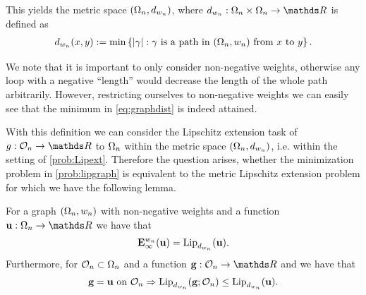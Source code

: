 %
This yields the metric space $(\Omega_n, d_{w_n})$, where $d_{w_n}:\domain_n\times\domain_n\to\R$ is defined as
%
\begin{align}\label{eq:graphdist}
d_{w_n}(x,y) := \min \left\{ \left|\gamma\right|: \gamma \text{ is a path in } 
(\Omega_n, w_n)\text{ from } x \text{ to } y\right\}.
\end{align}
%
\begin{remark}{}{}
We note that it is important to only consider non-negative weights, otherwise any loop with a negative \enquote{length} would decrease the 
length of the whole path arbitrarily. However, restricting ourselves to non-negative weights we can easily see that the minimum in \cref{eq:graphdist} is indeed attained.
\end{remark}
%
\noindent%
With this definition we can consider the Lipschitz extension task of $g:\conset_n\to\R$ to $\Omega_n$ within the metric space $(\Omega_n,d_{w_n})$, i.e. within the setting of \cref{prob:Lipext}. Therefore the question arises, whether the minimization problem in \cref{prob:lipgraph} is equivalent to the metric Lipschitz extension problem for which we have the following lemma.
%
%
\begin{lemma}{}{}
For a graph $(\Omega_n, w_n)$ with non-negative weights and a function $\vec u:\domain_n\to\R$ we have that 
\begin{align*}
\mathbf{E}_\infty^{w_n}(\mathbf{u}) = \operatorname{Lip}_{d_{w_n}}(\mathbf{u}).
\end{align*}
%
Furthermore, for $\mathcal{O}_n\subset\Omega_n$ and a function $\vec g:\conset_n\to\R$ and we have that
%
\begin{align*}
\mathbf{g} = \mathbf{u} \text{ on } \mathcal{O}_n\Rightarrow
\operatorname{Lip}_{d_{w_n}}(\mathbf{g};\mathcal{O}_n) \leq \operatorname{Lip}_{d_{w_n}}(\mathbf{u}).
\end{align*}
\end{lemma}
%
%
